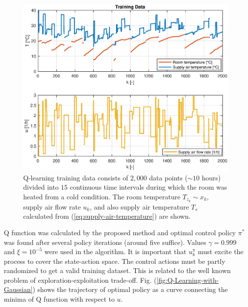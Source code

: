 \documentclass{ifacconf}
\begin{document}
\begin{figure}
\centering{}\includegraphics[width=0.95\columnwidth]{figures/training_data}
\caption{\label{fig:Q-Learning-training-data}Q-learning training data consists
of $2,000$ data points ($\sim10$ hours) divided into $15$ continuous
time intervals during which the room was heated from a cold condition.
The room temperature $T_{z_{k}}\sim x_{k}$, supply air flow rate
$u_{k}$, and also supply air temperature $T_{s}$ calculated from
(\ref{eq:supply-air-temperature}) are shown. }
\end{figure}
Q function was calculated by the proposed method and optimal control
policy $\pi^{*}$ was found after several policy iterations (around
five suffice). Values $\gamma=0.999$ and $\xi=10^{-5}$ were used
in the algorithm. It is important that $u_{k}^{\pi}$ must excite
the process to cover the state-action space. The control actions must
be partly randomized to get a valid training dataset. This is related
to the well known problem of exploration-exploitation trade-off. Fig.
(\ref{fig:Q-Learning-with-Gaussian}) shows the trajectory of optimal
policy as a curve connecting the minima of Q function with respect
to $u$.
\end{document}
